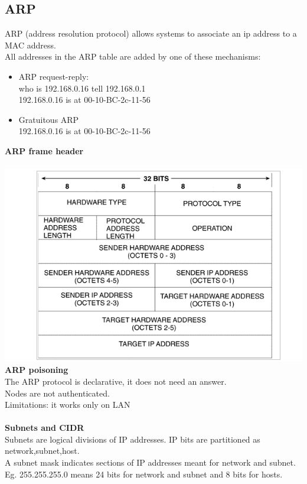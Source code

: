 \documentclass[10pt,a4paper]{article}
\begin{document}
\subsection{ARP}
ARP (address resolution protocol) allows systems to associate an ip address to a MAC address.\\
All addresses in the ARP table are added by one of these mechanisms:
\begin{itemize}
\item ARP request-reply: \\
who	is	192.168.0.16 tell 192.168.0.1\\
192.168.0.16	is	at	00-10-BC-2c-11-56
\item Gratuitous ARP\\
192.168.0.16	is	at	00-10-BC-2c-11-56
\end{itemize}
\textbf{ARP frame header}\\\\
\includegraphics[scale=0.6]{arp.png}\\
\textbf{ARP poisoning}\\
The ARP protocol is declarative, it does not need an answer.\\
Nodes are not authenticated.\\
Limitations: it works only on LAN\\\\
\newpage
\textbf{Subnets and CIDR}\\
Subnets are logical divisions of IP addresses. IP bits are partitioned as network,subnet,host.\\
A subnet mask indicates sections of IP addresses meant for network and subnet.\\
Eg. 255.255.255.0 means 24 bits for network and subnet and 8 bits for hosts.\\\\
\end{document}
